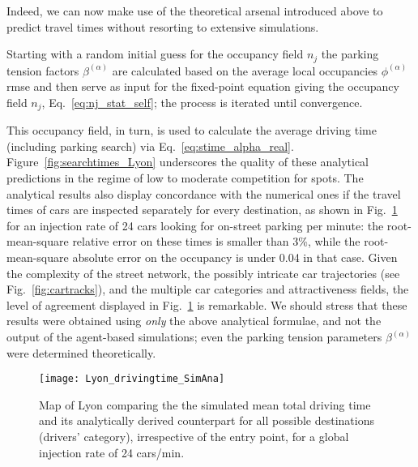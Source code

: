 \documentclass[trsc,reprint]{informs3}
\newcommand{\alp}{^{(\alpha)}}
\newcommand{\AN}[1]{#1}
\begin{document}
Indeed, we can now make use of the theoretical \AN{arsenal} introduced above to predict travel times
without resorting to extensive simulations. 
\AN{
Starting with a random initial guess for the occupancy field $n_j$
the parking tension factors $\beta\alp$ are calculated based on the average local occupancies $\phi\alp$rmse and then serve as input for the fixed-point equation
giving the occupancy field $n_j$, Eq.~\ref{eq:nj_stat_self}; the process is iterated until convergence.
}
This occupancy field, in turn, is used to calculate the average driving time (including parking search) via Eq.~\ref{eq:stime_alpha_real}.
Figure~\ref{fig:searchtimes_Lyon} underscores the quality of these analytical predictions in the regime of low to moderate competition for spots.
The analytical results also display concordance with the numerical ones if the travel times of cars are inspected separately for every destination, as shown in Fig.~\ref{fig:Lyon_stimes_dest} for an injection rate of 24 cars looking for on-street parking per minute: the root-mean-square relative error on these times is smaller than 3\%, while the root-mean-square absolute error on the occupancy is under 0.04 in that case. Given the complexity of the street network, the possibly intricate car trajectories (see Fig.~\ref{fig:cartracks}), and the multiple car categories and attractiveness fields, the level of agreement displayed in Fig.~\ref{fig:Lyon_stimes_dest} is remarkable. We should stress that these results were obtained using \emph{only} the above analytical formulae, and not the output of the agent-based simulations; even the parking tension parameters $\beta\alp$ were determined theoretically.





\begin{figure}[!htb]
    \centering
 
        \texttt{[image: Lyon\_drivingtime\_SimAna]}
\caption{Map of Lyon comparing the the simulated mean total driving time and its analytically derived counterpart for all possible destinations (drivers' category), irrespective of the entry point, for a global injection rate of 24 cars/min.}
\label{fig:Lyon_stimes_dest}
\end{figure}
\end{document}
